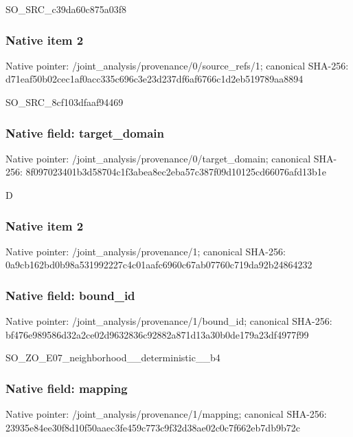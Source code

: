 \documentclass[10pt,a4paper]{article}
\begin{document}
\begingroup\raggedright\sloppy SO\_\allowbreak{}SRC\_\allowbreak{}c39da60c875a03f8\par\endgroup

\subsubsection{Native item 2}
Native pointer: /joint\_\allowbreak{}analysis/provenance/0/source\_\allowbreak{}refs/1; canonical SHA-256: d71eaf50b02cec1af0acc335c696c3e23d237df6af6766c1d2eb519789aa8894

\begingroup\raggedright\sloppy SO\_\allowbreak{}SRC\_\allowbreak{}8cf103dfaaf94469\par\endgroup

\subsubsection{Native field: target\_\allowbreak{}domain}
Native pointer: /joint\_\allowbreak{}analysis/provenance/0/target\_\allowbreak{}domain; canonical SHA-256: 8f097023401b3d58704c1f3abea8ec2eba57c387f09d10125cd66076afd13b1e

\begingroup\raggedright\sloppy D\par\endgroup

\subsubsection{Native item 2}
Native pointer: /joint\_\allowbreak{}analysis/provenance/1; canonical SHA-256: 0a9cb162bd0b98a531992227c4c01aafc6960c67ab07760c719da92b24864232

\subsubsection{Native field: bound\_\allowbreak{}id}
Native pointer: /joint\_\allowbreak{}analysis/provenance/1/bound\_\allowbreak{}id; canonical SHA-256: bf476e989586d32a2ce02d9632836c92882a871d13a30b0de179a23df4977f99

\begingroup\raggedright\sloppy SO\_\allowbreak{}ZO\_\allowbreak{}E07\_\allowbreak{}neighborhood\_\allowbreak{}\_\allowbreak{}deterministic\_\allowbreak{}\_\allowbreak{}b4\par\endgroup

\subsubsection{Native field: mapping}
Native pointer: /joint\_\allowbreak{}analysis/provenance/1/mapping; canonical SHA-256: 23935e84ee30f8d10f50aaec3fe459c773c9f32d38ae02c0c7f662eb7db9b72c
\end{document}

